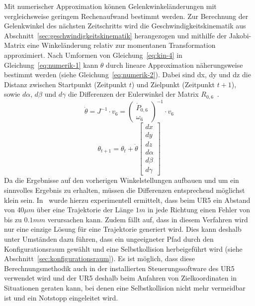 Mit numerischer Approximation können Gelenkwinkeländerungen mit vergleichsweise geringem Rechenaufwand bestimmt werden.
Zur Berechnung der Gelenkwinkel des nächsten Zeitschritts wird die Geschwindigkeitskinematik aus Abschnitt~\ref{sec:geschwindigkeitskinematik} herangezogen und mithilfe der Jakobi-Matrix eine Winkeländerung relativ zur momentanen Transformation approximiert.
Nach Umformen von Gleichung~\ref{eq:kin-4} in Gleichung~\ref{eq:numerik-1} kann $\theta$ durch lineare Approximation näherungsweise bestimmt werden (siehe Gleichung~\ref{eq:numerik-2}).
Dabei sind dx, dy und dz die Distanz zwischen Startpunkt (Zeitpunkt $t$) und Zielpunkt (Zeitpunkt $t+1$), sowie $d\alpha$, $d\beta$ und $d\gamma$ die Differenzen der Eulerwinkel der Matrix $R_{0,6}$~\cite[123]{sicilianoRobotics2009}.
\begin{equation}
    \dot{\theta} =  J^{-1} \cdot v_6 =
    \begin{pmatrix}
        \dot{P}_{0,6} \\ \omega_6
    \end{pmatrix}^{-1} \cdot v_6
    \label{eq:numerik-1}
\end{equation}
\begin{equation}
    \theta_{t+1} = \theta_t + \dot{\theta}
    \begin{bmatrix}
        dx \\ dy \\ dz \\ d\alpha \\ d\beta \\ d\gamma
    \end{bmatrix}
    \label{eq:numerik-2}
\end{equation}
Da die Ergebnisse auf den vorherigen Winkelstellungen aufbauen und um ein sinnvolles Ergebnis zu erhalten, müssen die Differenzen entsprechend möglichst klein sein.
In~\cite{degierControlRoboticArm2015} wurde hierzu experimentell ermittelt, dass beim UR5 ein Abstand von $40\mu m$ über eine Trajektorie der Länge $1m$ in jede Richtung einen Fehler von bis zu $0.1mm$ verursachen kann.
Zudem fällt auf, dass in diesem Verfahren wird nur eine einzige Lösung für eine Trajektorie generiert wird.
Dies kann deshalb unter Umständen dazu führen, dass ein ungeeigneter Pfad durch den Konfigurationsraum gewählt und eine Selbstkollision herbeigeführt wird (siehe Abschnitt~\ref{sec:konfigurationsraum}).
Es ist möglich, dass diese Berechnungsmethodik auch in der installierten Steuerungssoftware des UR5 verwendet wird und der UR5 deshalb beim Anfahren von Zielkoordinaten in Situationen geraten kann, bei denen eine Selbstkollision nicht mehr vermeidbar ist und ein Notstopp eingeleitet wird.


